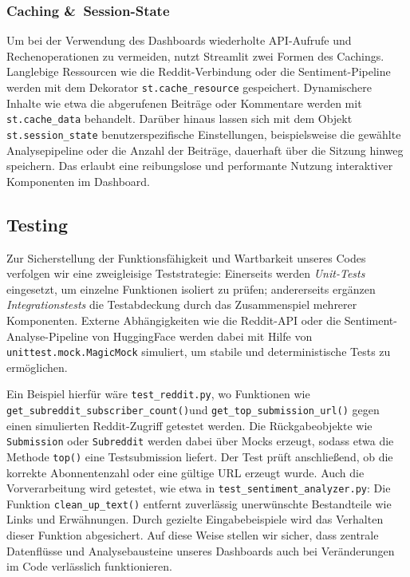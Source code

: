 \subsubsection{Caching \&~Session-State}
Um bei der Verwendung des Dashboards wiederholte API-Aufrufe und Rechenoperationen zu vermeiden, nutzt Streamlit zwei Formen des Cachings.
Langlebige Ressourcen wie die Reddit-Verbindung oder die Sentiment-Pipeline werden mit dem Dekorator \texttt{st.cache\_resource} gespeichert.
Dynamischere Inhalte wie etwa die abgerufenen Beiträge oder Kommentare werden mit \texttt{st.cache\_data} behandelt.
Darüber hinaus lassen sich mit dem Objekt \texttt{st.session\_state} benutzerspezifische Einstellungen, beispielsweise die gewählte Analysepipeline oder die Anzahl der Beiträge, dauerhaft über die Sitzung hinweg speichern.
Das erlaubt eine reibungslose und performante Nutzung interaktiver Komponenten im Dashboard.

\subsection{Testing}
Zur Sicherstellung der Funktionsfähigkeit und Wartbarkeit unseres Codes verfolgen wir eine zweigleisige Teststrategie: Einerseits werden \emph{Unit-Tests} eingesetzt, um einzelne Funktionen isoliert zu prüfen; andererseits ergänzen \emph{Integrationstests} die Testabdeckung durch das Zusammenspiel mehrerer Komponenten. Externe Abhängigkeiten wie die Reddit-API oder die Sentiment-Analyse-Pipeline von HuggingFace werden dabei mit Hilfe von \texttt{unittest.mock.MagicMock} simuliert, um stabile und deterministische Tests zu ermöglichen.

Ein Beispiel hierfür wäre \texttt{test\_reddit.py}, wo Funktionen wie \newline
\texttt{get\_subreddit\_subscriber\_count()}und \texttt{get\_top\_submission\_url()} \newline
gegen einen simulierten Reddit-Zugriff getestet werden. Die Rückgabeobjekte wie \newline
\texttt{Submission} oder \texttt{Subreddit} werden dabei über Mocks erzeugt, sodass etwa die Methode \texttt{top()} eine Testsubmission liefert. Der Test prüft anschließend, ob die korrekte Abonnentenzahl oder eine gültige URL erzeugt wurde.
Auch die Vorverarbeitung wird getestet, wie etwa in \texttt{test\_sentiment\_analyzer.py}: \newline
Die Funktion \texttt{clean\_up\_text()} entfernt zuverlässig unerwünschte Bestandteile wie Links und Erwähnungen. Durch gezielte Eingabebeispiele wird das Verhalten dieser Funktion abgesichert.
Auf diese Weise stellen wir sicher, dass zentrale Datenflüsse und Analysebausteine unseres Dashboards auch bei Veränderungen im Code verlässlich funktionieren.
